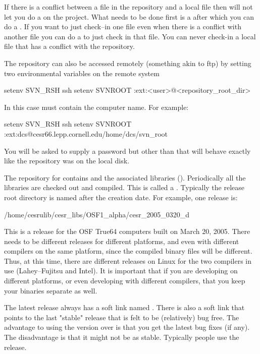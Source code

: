 If there is a conflict between a file in the repository and a local
file then \svn will not let you do a  on the project. What
needs to be done first is a  after which you can do a
. If you want to just check--in one file even when there is
a conflict with another file you can do a  to just
check in that file. You can never check-in a local file that has a
conflict with the repository.

The repository can also be accessed remotely (something akin to ftp)
by setting two environmental variables on the remote system
\begin{example}
  setenv SVN_RSH ssh
  setenv SVNROOT :ext:<user>@<repository_root_dir>
\end{example}
In this case  must contain the computer name. For example:
\begin{example}
  setenv SVN_RSH ssh
  setenv SVNROOT :ext:dcs@cesr66.lepp.cornell.edu/home/dcs/svn_root
\end{example}
You will be asked to supply a password but other than that will
behave exactly like the repository was on the local disk.



The \svn repository for \bmad contains \bmad and the associated
libraries (). Periodically all the libraries are checked
out and compiled. This is called a . Typically the release
root directory is named after the creation date. For example, one release is:
\begin{example}
  /home/cesrulib/cesr_libs/OSF1_alpha/cesr_2005_0320_d
\end{example}
This is a release for the OSF True64 computers built on March 20,
2005. There needs to be different releases for different platforms,
and even with different compilers on the same platform, since the
compiled binary files will be different. Thus, at this time, there are
different releases on Linux for the two compilers in use
(Lahey--Fujitsu and Intel). It is important that if you are developing on
different platforms, or even developing with different compilers, that
you keep your binaries separate as well.

The latest release always has a soft link named . There is
also a  soft link that points to the last "stable" release
that is felt to be (relatively) bug free. The advantage to using the
 version over  is that you get the latest bug
fixes (if any). The disadvantage is that it might not be as
stable. Typically people use the  release.


